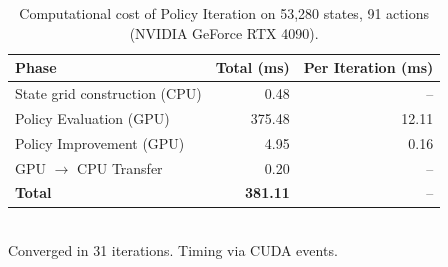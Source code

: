 \begin{table}[h]
\centering
\caption{Computational cost of Policy Iteration on 53,280 states, 91 actions (NVIDIA GeForce RTX 4090).}
\label{tab:profiling}
\begin{tabular}{l r r}
\toprule
Phase & Total (ms) & Per Iteration (ms) \\
\midrule
State grid construction (CPU) & 0.48 & -- \\
Policy Evaluation (GPU)       & 375.48 & 12.11 \\
Policy Improvement (GPU)      & 4.95 & 0.16 \\
GPU $\to$ CPU Transfer        & 0.20 & -- \\
\midrule
\textbf{Total}              & \textbf{381.11} & -- \\
\bottomrule
\end{tabular}
\\[4pt]
\footnotesize Converged in 31 iterations. Timing via CUDA events.
\end{table}
